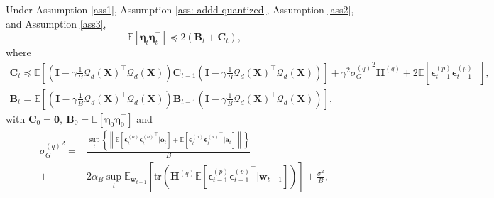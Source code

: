 \documentclass[11pt, letterpaper]{article}
\begin{document}
\begin{lemma}
    \label{update rule for eta_t^2, master}
    Under Assumption \ref{ass1}, Assumption \ref{ass: addd quantized}, Assumption \ref{ass2}, and Assumption \ref{ass3},
    \begin{equation*}
        \mathbb{E}\left[\boldsymbol{\eta}_t\boldsymbol{\eta}_t^\top\right]\preceq 2(\mathbf{B}_t+\mathbf{C}_t),
    \end{equation*}
    where
    \begin{gather*}
            \mathbf{C}_t
            \preceq \mathbb{E}\left[\left(\mathbf{I}-\gamma\frac{1}{B} {\mathcal{Q}_d(\mathbf{X})}^\top \mathcal{Q}_d(\mathbf{X}) \right)\mathbf{C}_{t-1}\left(\mathbf{I}-\gamma\frac{1}{B} {\mathcal{Q}_d(\mathbf{X})}^\top \mathcal{Q}_d(\mathbf{X}) \right)\right]+\gamma^2 {\sigma_G^{(q)}}^2\mathbf{H}^{(q)}+2\mathbb{E}\left[\boldsymbol{\epsilon}_{t-1}^{(p)}{\boldsymbol{\epsilon}_{t-1}^{(p)}}^\top\right],\\
            \mathbf{B}_t
            = \mathbb{E}\left[\left(\mathbf{I}-\gamma\frac{1}{B} {\mathcal{Q}_d(\mathbf{X})}^\top \mathcal{Q}_d(\mathbf{X}) \right)\mathbf{B}_{t-1}\left(\mathbf{I}-\gamma\frac{1}{B} {\mathcal{Q}_d(\mathbf{X})}^\top \mathcal{Q}_d(\mathbf{X}) \right)\right],
    \end{gather*}
    with $\mathbf{C}_0=\boldsymbol{0},\ \mathbf{B}_0=\mathbb{E}\left[\boldsymbol{\eta}_0\boldsymbol{\eta}_0^\top\right]$ and
    \begin{equation*}
        \begin{aligned}
            {\sigma_G^{(q)}}^2=&\frac{\sup_t \left\{\left\|\mathbb{E}\left[\boldsymbol{\epsilon}_t^{(o)}{\boldsymbol{\epsilon}_t^{(o)}}^\top|\mathbf{o}_t\right]+\mathbb{E}\left[\boldsymbol{\epsilon}_t^{(a)}{\boldsymbol{\epsilon}_t^{(a)}}^\top|\mathbf{a}_t\right] \right\|\right\}}{B}\\
            +&2\alpha_B\sup_t\mathbb{E}_{\mathbf{w}_{t-1}}\left[\mathrm{tr}\left(\mathbf{H}^{(q)} \mathbb{E}\left[\boldsymbol{\epsilon}_{t-1}^{(p)}{\boldsymbol{\epsilon}_{t-1}^{(p)}}^\top \big| \mathbf{w}_{t-1}\right]\right)\right]
            +\frac{\sigma^2}{B},
        \end{aligned}
    \end{equation*}
\end{lemma}
\end{document}

